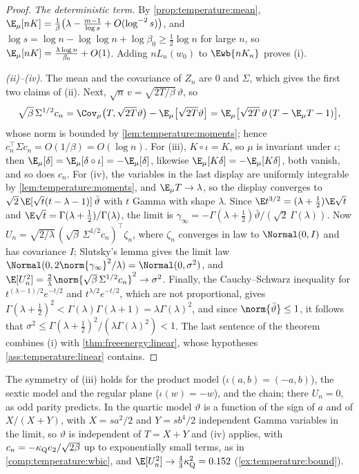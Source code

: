\begin{refsection}
\begin{proof}
\emph{The deterministic term.} By \cref{prop:temperature:mean}, $\E_\mu[nK]=\frac1\beta\bigl(\lambda-\frac{m-1}{\log s}+O(\log^{-2}s)\bigr)$, and $\log s=\log n-\log\log n+\log\beta_0\ge\frac12\log n$ for large $n$, so $\E_\mu[nK]=\frac{\lambda\log n}{\beta_0}+O(1)$. Adding $nL_n(w_0)$ to $\Ewb{nK_n}$ proves (i).

\emph{(ii)--(iv).} The mean and the covariance of $Z_n$ are $0$ and $\Sigma$, which gives the first two claims of (ii). Next, $\sqrt n\,v=\sqrt{2T/\beta}\,\vartheta$, so
\[
\sqrt\beta\,\Sigma^{1/2}c_n=\Cov_\mu\bigl(T,\sqrt{2T}\vartheta\bigr)-\E_\mu\bigl[\sqrt{2T}\vartheta\bigr]=\E_\mu\bigl[\sqrt{2T}\,\vartheta\,(T-\E_\mu T-1)\bigr],
\]
whose norm is bounded by \cref{lem:temperature:moments}; hence $c_n^\top\Sigma c_n=O(1/\beta)=O(\log n)$. For (iii), $K\circ\iota=K$, so $\mu$ is invariant under $\iota$; then $\E_\mu[\delta]=\E_\mu[\delta\circ\iota]=-\E_\mu[\delta]$, likewise $\E_\mu[K\delta]=-\E_\mu[K\delta]$, both vanish, and so does $c_n$. For (iv), the variables in the last display are uniformly integrable by \cref{lem:temperature:moments}, and $\E_\mu T\to\lambda$, so the display converges to $\sqrt2\,\E[\sqrt t(t-\lambda-1)]\,\bar\vartheta$ with $t$ Gamma with shape $\lambda$. Since $\E t^{3/2}=(\lambda+\frac12)\E\sqrt t$ and $\E\sqrt t=\Gamma(\lambda+\frac12)/\Gamma(\lambda)$, the limit is $\gamma_\infty=-\Gamma(\lambda+\frac12)\bar\vartheta/(\sqrt2\,\Gamma(\lambda))$. Now $U_n=\sqrt{2/\lambda}\,(\sqrt\beta\,\Sigma^{1/2}c_n)^\top\zeta_n$, where $\zeta_n$ converges in law to $\Normal(0,I)$ and has covariance $I$; Slutsky's lemma gives the limit law $\Normal(0,2\norm{\gamma_\infty}^2/\lambda)=\Normal(0,\sigma^2)$, and $\E[U_n^2]=\frac2\lambda\norm{\sqrt\beta\,\Sigma^{1/2}c_n}^2\to\sigma^2$. Finally, the Cauchy--Schwarz inequality for $t^{(\lambda-1)/2}e^{-t/2}$ and $t^{\lambda/2}e^{-t/2}$, which are not proportional, gives $\Gamma(\lambda+\frac12)^2<\Gamma(\lambda)\Gamma(\lambda+1)=\lambda\Gamma(\lambda)^2$, and since $\norm{\bar\vartheta}\le1$, it follows that $\sigma^2\le\Gamma(\lambda+\frac12)^2/(\lambda\Gamma(\lambda)^2)<1$. The last sentence of the theorem combines (i) with \cref{thm:freeenergy:linear}, whose hypotheses \cref{ass:temperature:linear} contains.
\end{proof}

The symmetry of (iii) holds for the product model ($\iota(a,b)=(-a,b)$), the sextic model and the regular plane ($\iota(w)=-w$), and the chain; there $U_n=0$, as odd parity predicts. In the quartic model $\vartheta$ is a function of the sign of $a$ and of $X/(X+Y)$, with $X=sa^2/2$ and $Y=sb^4/2$ independent Gamma variables in the limit, so $\vartheta$ is independent of $T=X+Y$ and (iv) applies, with $c_n=-\kappa_{\mathrm{Q}} e_2/\sqrt{2\beta}$ up to exponentially small terms, as in \cref{comp:temperature:wbic}, and $\E[U_n^2]\to\frac43\temperaturekQ^2=0.152$ (\cref{ex:temperature:bound}).


\end{refsection}

